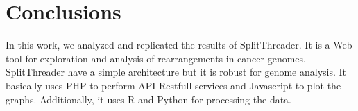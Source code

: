 \documentclass{svproc}
\begin{document}
\section{Conclusions} \label{section:conclusions}	

In this work, we analyzed and replicated the results of SplitThreader. It is a Web tool for exploration and analysis of rearrangements in cancer genomes.\\

SplitThreader have a simple architecture but it is robust for genome analysis. It basically uses PHP to perform API Restfull services and Javascript to plot the graphs. Additionally, it uses R and Python for processing the data.\\






\end{document}
